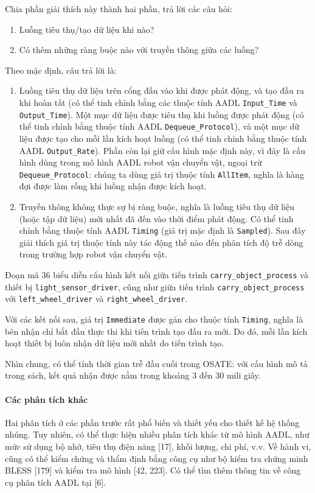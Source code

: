 Chia phần giải thích này thành hai phần, trả lời các câu hỏi:
\begin{enumerate}
\item Luồng tiêu thụ/tạo dữ liệu khi nào?
\item Có thêm những ràng buộc nào với truyền thông giữa các luồng?
\end{enumerate}

Theo mặc định, câu trả lời là:
\begin{enumerate}
\item Luồng tiêu thụ dữ liệu trên cổng đầu vào khi được phát động, và tạo đầu ra khi hoàn tất (có thể tinh chỉnh bằng các thuộc tính AADL \texttt{Input\_Time} và \texttt{Output\_Time}). Một mục dữ liệu được tiêu thụ khi luồng được phát động (có thể tinh chỉnh bằng thuộc tính AADL \texttt{Dequeue\_Protocol}), và một mục dữ liệu được tạo cho mỗi lần kích hoạt luồng (có thể tinh chỉnh bằng thuộc tính AADL \texttt{Output\_Rate}). Phần còn lại giữ cấu hình mặc định này, vì đây là cấu hình dùng trong mô hình AADL robot vận chuyển vật, ngoại trừ \texttt{Dequeue\_Protocol}: chúng ta dùng giá trị thuộc tính \texttt{AllItem}, nghĩa là hàng đợi được làm rỗng khi luồng nhận được kích hoạt.
\item Truyền thông không thực sự bị ràng buộc, nghĩa là luồng tiêu thụ dữ liệu (hoặc tập dữ liệu) mới nhất đã đến vào thời điểm phát động. Có thể tinh chỉnh bằng thuộc tính AADL \texttt{Timing} (giá trị mặc định là \texttt{Sampled}). Sau đây giải thích giá trị thuộc tính này tác động thế nào đến phân tích độ trễ dòng trong trường hợp robot vận chuyển vật.
\end{enumerate}

Đoạn mã 36 biểu diễn cấu hình kết nối giữa tiến trình \texttt{carry\_object\_process} và thiết bị \texttt{light\_sensor\_driver}, cũng như giữa tiến trình \texttt{carry\_object\_process} với \texttt{left\_wheel\_driver} và \texttt{right\_wheel\_driver}.

Với các kết nối sau, giá trị \texttt{Immediate} được gán cho thuộc tính \texttt{Timing}, nghĩa là bên nhận chỉ bắt đầu thực thi khi tiến trình tạo đầu ra mới. Do đó, mỗi lần kích hoạt thiết bị luôn nhận dữ liệu mới nhất do tiến trình tạo.

Nhìn chung, có thể tính thời gian trễ đầu cuối trong OSATE: với cấu hình mô tả trong sách, kết quả nhận được nằm trong khoảng 3 đến 30 mili giây.

\paragraph{Các phân tích khác}
Hai phân tích ở các phần trước rất phổ biến và thiết yếu cho thiết kế hệ thống nhúng. Tuy nhiên, có thể thực hiện nhiều phân tích khác từ mô hình AADL, như mức sử dụng bộ nhớ, tiêu thụ điện năng [17], khối lượng, chi phí, v.v. Về hành vi, cũng có thể kiểm chứng và thẩm định bằng công cụ như bộ kiểm tra chứng minh BLESS [179] và kiểm tra mô hình [42, 223]. Có thể tìm thêm thông tin về công cụ phân tích AADL tại [6].

